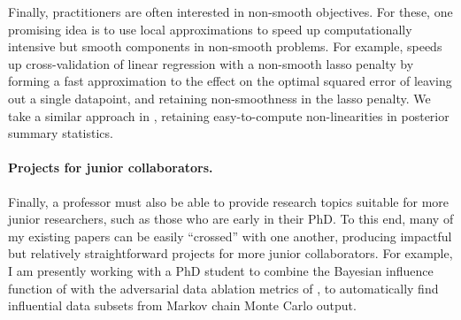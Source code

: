 Finally, practitioners are often interested in non-smooth objectives. For these,
one promising idea is to use local approximations to speed up computationally
intensive but smooth components in non-smooth problems. For example,
\citet{wilson:2020:approximatecv} speeds up cross-validation of linear
regression with a non-smooth lasso penalty by forming a fast approximation to
the effect on the optimal squared error of leaving out a single datapoint, and
retaining non-smoothness in the lasso penalty. We take a similar approach in
\citet{giordano:2021:bnpsensitivity}, retaining easy-to-compute non-linearities
in posterior summary statistics.


\paragraph{Projects for junior collaborators.}
%
Finally, a professor must also be able to provide research topics suitable for
more junior researchers, such as those who are early in their PhD.  To this end,
many of my existing papers can be easily ``crossed'' with one another, producing
impactful but relatively straightforward projects for more junior collaborators.
For example, I am presently working with a PhD student to combine the Bayesian
influence function of \citet{giordano:2021:bayesij} with the adversarial data
ablation metrics of \citet{giordano:2020:amip}, to automatically find
influential data subsets from Markov chain Monte Carlo output.


\newpage





